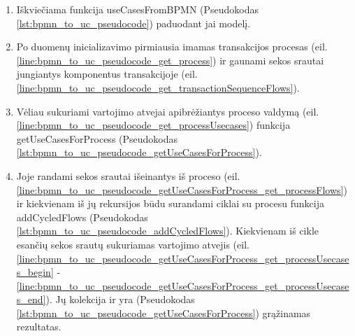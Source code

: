 \renewcommand{\lstlistingname}{Pseudokodas}%
\renewcommand{\lstlistlistingname}{Pseudokodo fragmentai}%
\begin{enumerate}
	\item Iškviečiama funkcija useCasesFromBPMN (Pseudokodas \ref{lst:bpmn_to_uc_pseudocode}) paduodant jai \BPMN modelį.
	
	\item Po duomenų inicializavimo pirmiausia imamas transakcijos procesas (eil. \ref{line:bpmn_to_uc_pseudocode_get_process}) ir gaunami sekos srautai jungiantys komponentus transakcijoje (eil. \ref{line:bpmn_to_uc_pseudocode_get_transactionSequenceFlows}). 
	\item Vėliau sukuriami vartojimo atvejai apibrėžiantys proceso valdymą (eil. \ref{line:bpmn_to_uc_pseudocode_get_processUsecases}) funkcija getUseCasesForProcess (Pseudokodas  \ref{lst:bpmn_to_uc_pseudocode_getUseCasesForProcess}).
	
	\item Joje randami sekos srautai išeinantys iš proceso (eil. \ref{line:bpmn_to_uc_pseudocode_getUseCasesForProcess_get_processFlows}) ir kiekvienam iš jų rekursijos būdu surandami ciklai su procesu funkcija addCycledFlows (Pseudokodas  \ref{lst:bpmn_to_uc_pseudocode_addCycledFlows}). Kiekvienam iš cikle esančių sekos srautų sukuriamas vartojimo atvejis (eil. \ref{line:bpmn_to_uc_pseudocode_getUseCasesForProcess_get_processUsecases_begin} - \ref{line:bpmn_to_uc_pseudocode_getUseCasesForProcess_get_processUsecases_end}). Jų kolekcija ir yra (Pseudokodas  \ref{lst:bpmn_to_uc_pseudocode_getUseCasesForProcess}) grąžinamas rezultatas.
	

\end{enumerate}
